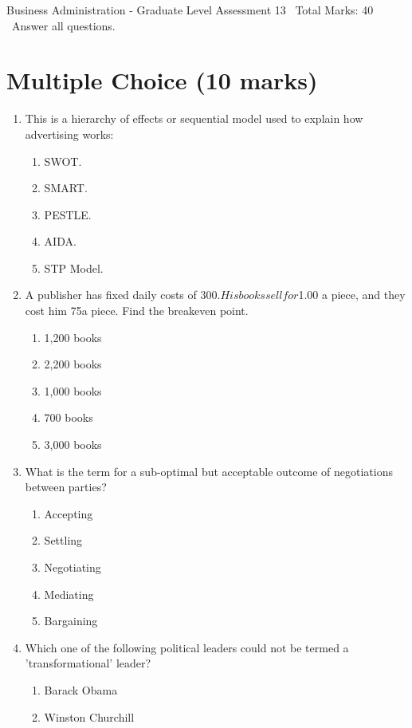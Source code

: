 \documentclass[12pt]{article}
\begin{document}
\begin{center}
Business Administration - Graduate Level Assessment 13 \
Total Marks: 40 \
Answer all questions.
\end{center}

\section*{Multiple Choice (10 marks)}
\begin{enumerate}[label=\arabic*.]
\item This is a hierarchy of effects or sequential model used to explain how advertising works:
\begin{enumerate}[label=(\alph*)]
    \item SWOT.
    \item SMART.
    \item PESTLE.
    \item AIDA.
    \item STP Model.
\end{enumerate}
\item A publisher has fixed daily costs of $300. His books sell for $1.00 a piece, and they cost him 75\textcent a piece. Find the breakeven point.
\begin{enumerate}[label=(\alph*)]
    \item 1,200 books
    \item 2,200 books
    \item 1,000 books
    \item 700 books
    \item 3,000 books
\end{enumerate}
\item What is the term for a sub-optimal but acceptable outcome of negotiations between parties?
\begin{enumerate}[label=(\alph*)]
    \item Accepting
    \item Settling
    \item Negotiating
    \item Mediating
    \item Bargaining
\end{enumerate}
\item Which one of the following political leaders could not be termed a 'transformational' leader?
\begin{enumerate}[label=(\alph*)]
    \item Barack Obama
    \item Winston Churchill

\end{enumerate}
\end{enumerate}
\end{document}
